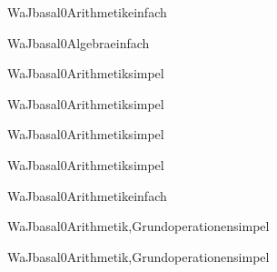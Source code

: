 \documentclass[12pt]{article}
\begin{document}
\begin{Add}{WaJ}{basal0}{Arithmetik}{einfach}
\end{Add}

\begin{Add}{WaJ}{basal0}{Algebra}{einfach}
\end{Add}

\begin{Add}{WaJ}{basal0}{Arithmetik}{simpel}
\end{Add}

\begin{Add}{WaJ}{basal0}{Arithmetik}{simpel}
\end{Add}

\begin{Add}{WaJ}{basal0}{Arithmetik}{simpel}
\end{Add}

\begin{Add}{WaJ}{basal0}{Arithmetik}{simpel}
\end{Add}

\begin{Add}{WaJ}{basal0}{Arithmetik}{einfach}
\end{Add}

\begin{Add}{WaJ}{basal0}{Arithmetik,Grundoperationen}{simpel}
\end{Add}

\begin{Add}{WaJ}{basal0}{Arithmetik,Grundoperationen}{simpel}
\end{Add}
\end{document}
